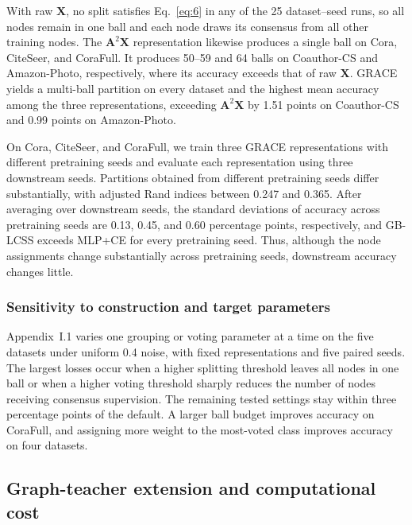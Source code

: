 \documentclass[a4paper,fleqn]{cas-sc}
\theoremstyle{definition}
\theoremstyle{plain}
\begin{document}


With raw \(\mathbf{X}\), no split satisfies Eq.~\eqref{eq:6} in any of the 25 dataset--seed runs, so all nodes remain in one ball and each node draws its consensus from all other training nodes. The \(\mathbf{A}^2\mathbf{X}\) representation likewise produces a single ball on Cora, CiteSeer, and CoraFull. It produces 50--59 and 64 balls on Coauthor-CS and Amazon-Photo, respectively, where its accuracy exceeds that of raw \(\mathbf{X}\). GRACE yields a multi-ball partition on every dataset and the highest mean accuracy among the three representations, exceeding \(\mathbf{A}^2\mathbf{X}\) by 1.51 points on Coauthor-CS and 0.99 points on Amazon-Photo. 

On Cora, CiteSeer, and CoraFull, we train three GRACE representations with different pretraining seeds and evaluate each representation using three downstream seeds. Partitions obtained from different pretraining seeds differ substantially, with adjusted Rand indices \cite{ref74} between 0.247 and 0.365. After averaging over downstream seeds, the standard deviations of accuracy across pretraining seeds are 0.13, 0.45, and 0.60 percentage points, respectively, and GB-LCSS exceeds MLP+CE for every pretraining seed. Thus, although the node assignments change substantially across pretraining seeds, downstream accuracy changes little.

\subsubsection{Sensitivity to construction and target parameters}\label{sec:4.3.4}

Appendix~I.1 varies one grouping or voting parameter at a time on the five datasets under uniform 0.4 noise, with fixed representations and five paired seeds. The largest losses occur when a higher splitting threshold leaves all nodes in one ball or when a higher voting threshold sharply reduces the number of nodes receiving consensus supervision. The remaining tested settings stay within three percentage points of the default. A larger ball budget improves accuracy on CoraFull, and assigning more weight to the most-voted class improves accuracy on four datasets.

\subsection{Graph-teacher extension and computational cost}\label{sec:4.4}
\end{document}
